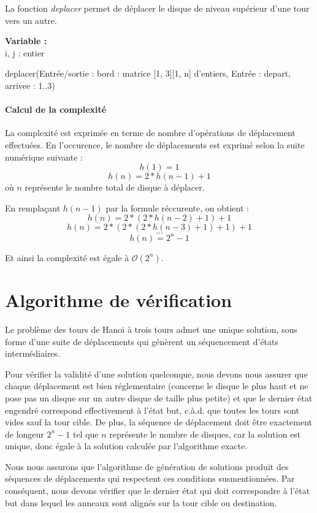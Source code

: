 La fonction \emph{deplacer} permet de déplacer le disque de niveau supérieur d'une tour vers un autre.

\begin{function}[H]
    \textbf{Variable :}\\
    i, j : entier\;
    \caption{deplacer(Entrée/sortie : bord : matrice {[1, 3]}{[1, n]} d'entiers, Entrée : depart, arrivee : 1..3)}
\end{function}

\paragraph{Calcul de la complexité}
La complexité est exprimée en terme de nombre d'opérations de déplacement effectuées. En l'occurence, le nombre de déplacements est exprimé selon la suite numérique suivante :
$$ h(1) = 1 $$
$$ h(n) = 2 * h(n - 1) + 1 $$
où $n$ représente le nombre total de disque à déplacer.

En remplaçant $h(n - 1)$ par la formule réccurente, on obtient :
$$ h(n) = 2 * (2 * h(n - 2) + 1) + 1 $$
$$ h(n) = 2 * (2 * (2 * h(n - 3) + 1) + 1) + 1 $$
$$ ... $$
$$ h(n) = 2^{n} - 1 $$

Et ainsi la complexité est égale à $\mathcal{O}(2^{n})$.

\section{Algorithme de vérification}
Le problème des tours de Hanoi à trois tours admet une unique solution, sous forme d'une suite de déplacements qui génèrent un séquencement d'états intermédiaires.
\par
Pour vérifier la validité d'une solution quelconque, nous devons nous assurer que chaque déplacement est bien réglementaire (concerne le disque le plus haut et ne pose pas un disque sur un autre disque de taille plus petite) et que le dernier état engendré correspond effectivement à l'état but, c.à.d. que toutes les tours sont vides sauf la tour cible. De plus, la séquence de déplacement doit être exactement de longeur $2^{n} - 1$ tel que $n$ représente le nombre de disques, car la solution est unique, donc égale à la solution calculée par l'algorithme exacte.
\par
Nous nous assurons que l'algorithme de génération de solutions produit des séquences de déplacements qui respectent ces conditions susmentionnées. Par conséquent, nous devons vérifier que le dernier état qui doit correspondre à l'état but dans lequel les anneaux sont alignés sur la tour cible ou destination.

